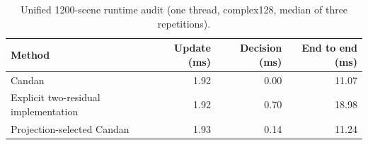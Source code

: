 \begin{table}[!ht]
\centering
\footnotesize
\caption{Unified 1200-scene runtime audit (one thread, complex128, median of three repetitions).}
\label{tab:supp_projection_runtime}
\begin{tabular}{lrrr}
\toprule
Method & Update (ms) & Decision (ms) & End to end (ms) \\
\midrule
Candan & 1.92 & 0.00 & 11.07 \\
Explicit two-residual implementation & 1.92 & 0.70 & 18.98 \\
Projection-selected Candan & 1.93 & 0.14 & 11.24 \\
\bottomrule
\end{tabular}
\end{table}
